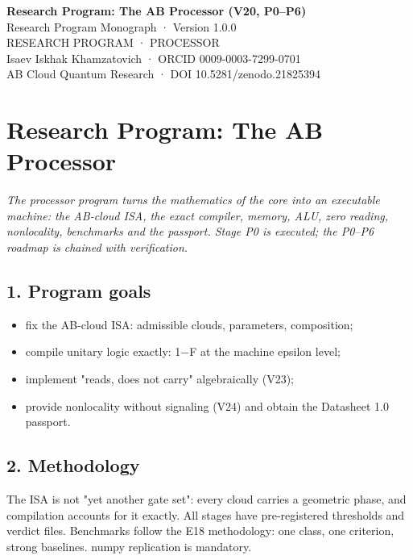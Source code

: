 \documentclass[11pt,a4paper]{article}
\begin{document}
\begin{center}
{\LARGE\bfseries Research Program: The AB Processor (V20, P0–P6)}\\[8pt]
{\large Research Program Monograph · Version 1.0.0}\\[6pt]
{\color{copper}\small RESEARCH PROGRAM · PROCESSOR}\\[4pt]
{\small Isaev Iskhak Khamzatovich · ORCID 0009-0003-7299-0701}\\[2pt]
{\small AB Cloud Quantum Research · DOI 10.5281/zenodo.21825394}
\end{center}

\tableofcontents
\newpage

\section{Research Program: The AB Processor}

\noindent\textit{\color{copper}The processor program turns the mathematics of the core into an executable machine: the AB-cloud ISA, the exact compiler, memory, ALU, zero reading, nonlocality, benchmarks and the passport. Stage P0 is executed; the P0–P6 roadmap is chained with verification.}

\subsection{1. Program goals}

\begin{itemize}
  \item fix the AB-cloud ISA: admissible clouds, parameters, composition;
  \item compile unitary logic exactly: 1−F at the machine epsilon level;
  \item implement "reads, does not carry" algebraically (V23);
  \item provide nonlocality without signaling (V24) and obtain the Datasheet 1.0 passport.
\end{itemize}

\subsection{2. Methodology}

The ISA is not "yet another gate set": every cloud carries a geometric phase, and compilation accounts for it exactly. All stages have pre-registered thresholds and verdict files. Benchmarks follow the E18 methodology: one class, one criterion, strong baselines. numpy replication is mandatory.
\end{document}
